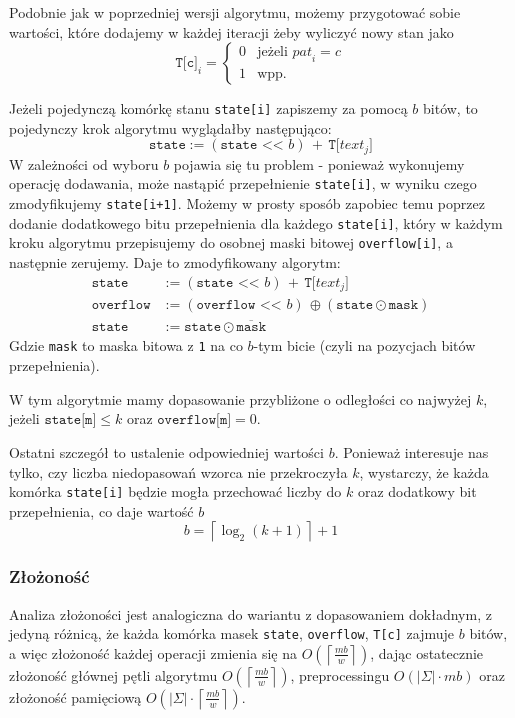 \documentclass{article}
\begin{document}
Podobnie jak w poprzedniej wersji algorytmu, możemy przygotować sobie wartości, które dodajemy w każdej iteracji żeby wyliczyć nowy stan jako
$$
\texttt{T[c]}_i = \begin{cases}
0&\text{jeżeli } \textit{pat}_i = c\\
1&\text {wpp.}
\end{cases}
$$

Jeżeli pojedynczą komórkę stanu \texttt{state[i]} zapiszemy za pomocą $b$ bitów, to pojedynczy krok algorytmu wyglądałby następująco:
$$
\texttt{state} := (\texttt{state << }b)\,+\,\texttt{T[}\textit{text}_j\texttt{]}
$$
W zależności od wyboru $b$ pojawia się tu problem - ponieważ wykonujemy operację dodawania, może nastąpić przepełnienie \texttt{state[i]}, w wyniku czego zmodyfikujemy \texttt{state[i+1]}.
Możemy w prosty sposób zapobiec temu poprzez dodanie dodatkowego bitu przepełnienia dla każdego \texttt{state[i]}, który w każdym kroku algorytmu przepisujemy do osobnej maski bitowej \texttt{overflow[i]}, a następnie zerujemy.
Daje to zmodyfikowany algorytm:
\begin{align*}
\texttt{state} &:= (\texttt{state << }b)\,+\,\texttt{T[}\textit{text}_j\texttt{]}\\
\texttt{overflow} &:= (\texttt{overflow << }b)\, \oplus (\texttt{state}\odot\texttt{mask})\\
\texttt{state} &:= \texttt{state}\odot \overline{\texttt{mask}}
\end{align*}
Gdzie \texttt{mask} to maska bitowa z \texttt{1} na co $b$-tym bicie (czyli na pozycjach bitów przepełnienia).

W tym algorytmie mamy dopasowanie przybliżone o odległości co najwyżej $k$, jeżeli $\texttt{state[m]}\leq k$ oraz $\texttt{overflow[m]}=0$.

Ostatni szczegół to ustalenie odpowiedniej wartości $b$. Ponieważ interesuje nas tylko, czy liczba niedopasowań wzorca nie przekroczyła $k$, wystarczy, że każda komórka \texttt{state[i]} będzie mogła przechować liczby do $k$ oraz dodatkowy bit przepełnienia, co daje wartość $b$
$$
b = \left\lceil \log_2(k+1) \right\rceil + 1
$$

\subsubsection*{Złożoność}
Analiza złożoności jest analogiczna do wariantu z dopasowaniem dokładnym, z jedyną różnicą, że każda komórka masek \texttt{state}, \texttt{overflow}, \texttt{T[c]} zajmuje $b$ bitów, a więc złożoność każdej operacji zmienia się na $O(\left\lceil\frac{mb}{w}\right\rceil)$, dając ostatecznie złożoność głównej pętli algorytmu $O(\left\lceil\frac{mb}{w}\right\rceil)$, preprocessingu $O(|\Sigma|\cdot mb)$ oraz złożoność pamięciową $O(|\Sigma|\cdot\left\lceil\frac{mb}{w}\right\rceil)$.
\end{document}
